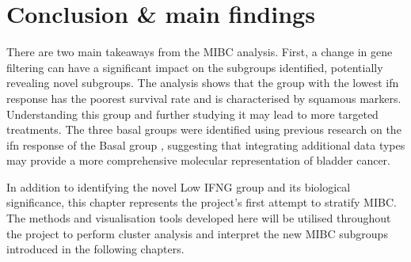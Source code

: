 \section{Conclusion \& main findings} 

There are two main takeaways from the MIBC analysis. First, a change in gene filtering can have a significant impact on the subgroups identified, potentially revealing novel subgroups. The analysis shows that the group with the lowest \acrfull{ifn} response has the poorest survival rate and is characterised by squamous markers. Understanding this group and further studying it may lead to more targeted treatments. The three basal groups were identified using previous research on the \acrshort{ifn} response of the Basal group \citep{Marzouka2018-ge,Baker2022-bj}, suggesting that integrating additional data types may provide a more comprehensive molecular representation of bladder cancer.

In addition to identifying the novel Low IFNG group and its biological significance, this chapter represents the project's first attempt to stratify MIBC. The methods and visualisation tools developed here will be utilised throughout the project to perform cluster analysis and interpret the new MIBC subgroups introduced in the following chapters.
